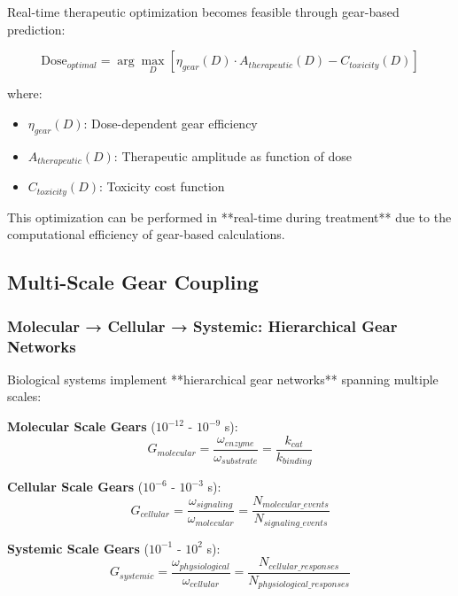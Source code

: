 \documentclass[12pt,a4paper]{article}
\begin{document}
Real-time therapeutic optimization becomes feasible through gear-based prediction:

\begin{equation}
\text{Dose}_{optimal} = \arg\max_{D} \left[\eta_{gear}(D) \cdot A_{therapeutic}(D) - C_{toxicity}(D)\right]
\end{equation}

where:
\begin{itemize}
\item $\eta_{gear}(D)$: Dose-dependent gear efficiency
\item $A_{therapeutic}(D)$: Therapeutic amplitude as function of dose
\item $C_{toxicity}(D)$: Toxicity cost function
\end{itemize}

This optimization can be performed in **real-time during treatment** due to the computational efficiency of gear-based calculations.

\subsection{Multi-Scale Gear Coupling}

\subsubsection{Molecular → Cellular → Systemic: Hierarchical Gear Networks}

Biological systems implement **hierarchical gear networks** spanning multiple scales:

\textbf{Molecular Scale Gears} ($10^{-12}$ - $10^{-9}$ s):
\begin{equation}
G_{molecular} = \frac{\omega_{enzyme}}{\omega_{substrate}} = \frac{k_{cat}}{k_{binding}}
\end{equation}

\textbf{Cellular Scale Gears} ($10^{-6}$ - $10^{-3}$ s):
\begin{equation}
G_{cellular} = \frac{\omega_{signaling}}{\omega_{molecular}} = \frac{N_{molecular\_events}}{N_{signaling\_events}}
\end{equation}

\textbf{Systemic Scale Gears} ($10^{-1}$ - $10^{2}$ s):
\begin{equation}
G_{systemic} = \frac{\omega_{physiological}}{\omega_{cellular}} = \frac{N_{cellular\_responses}}{N_{physiological\_responses}}
\end{equation}
\end{document}
